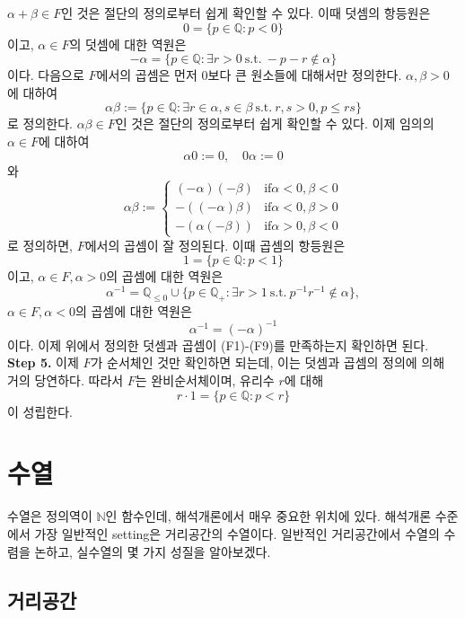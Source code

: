 \documentclass[11pt]{book}
\numberwithin{equation}{chapter}
\def\NN{\mathbb{N}}
\def\QQ{\mathbb{Q}}
\def\textif{\text{if}}
\theoremstyle{definition}
\begin{document}
\(\alpha + \beta \in F\)인 것은 절단의 정의로부터 쉽게 확인할 수 있다. 이때 덧셈의 항등원은
\[
0 = \{p \in \QQ : p < 0\}
\]
이고, \(\alpha \in F\)의 덧셈에 대한 역원은
\[
-\alpha = \{p \in \QQ : \exists r > 0 \ \text{s.t.} \ -p -r \notin \alpha\}    
\]
이다. 다음으로 \(F\)에서의 곱셈은 먼저 0보다 큰 원소들에 대해서만 정의한다. \(\alpha, \beta > 0\)에 대하여
\[
\alpha\beta := \{p \in \QQ : \exists r \in \alpha, s \in \beta \ \text{s.t.} \ r, s > 0, p \le rs\}
\]
로 정의한다. \(\alpha\beta \in F\)인 것은 절단의 정의로부터 쉽게 확인할 수 있다. 이제 임의의 \(\alpha \in F\)에 대하여
\[
\alpha0 := 0, \quad 0\alpha := 0
\]
와
\[
\alpha\beta := 
    \begin{cases}
        (-\alpha)(-\beta) &\textif \alpha < 0, \beta < 0\\
        -((-\alpha)\beta) &\textif \alpha < 0, \beta > 0\\
        -(\alpha(-\beta)) &\textif \alpha > 0, \beta < 0
    \end{cases}
\]
로 정의하면, \(F\)에서의 곱셈이 잘 정의된다. 이때 곱셈의 항등원은
\[
1 = \{p \in \QQ : p < 1\}    
\]
이고, \(\alpha \in F, \alpha > 0\)의 곱셈에 대한 역원은
\[
\alpha^{-1} = \QQ_{\le 0} \cup \{p \in \QQ_+ : \exists r > 1 \ \text{s.t.} \ p^{-1}r^{-1} \notin \alpha\},
\]
\(\alpha \in F, \alpha < 0\)의 곱셈에 대한 역원은
\[
\alpha^{-1} = (-\alpha)^{-1}
\]
이다. 이제 위에서 정의한 덧셈과 곱셈이 (F1)-(F9)를 만족하는지 확인하면 된다.\\
\textbf{Step 5.} 이제 \(F\)가 순서체인 것만 확인하면 되는데, 이는 덧셈과 곱셈의 정의에 의해 거의 당연하다. 따라서 \(F\)는 완비순서체이며, 유리수 \(r\)에 대해
\[
r \cdot 1 = \{p \in \QQ : p < r\}
\]
이 성립한다.




\chapter{수열}

수열은 정의역이 \(\NN\)인 함수인데, 해석개론에서 매우 중요한 위치에 있다. 해석개론 수준에서 가장 일반적인 setting은 거리공간의 수열이다. 일반적인 거리공간에서 수열의 수렴을 논하고, 실수열의 몇 가지 성질을 알아보겠다.

\section{거리공간}
\end{document}

